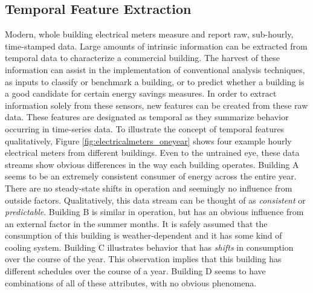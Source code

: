 \subsection{Temporal Feature Extraction}
\label{temporalfeatureextraction}
Modern, whole building electrical meters measure and report raw, sub-hourly, time-stamped data. Large amounts of intrinsic information can be extracted from temporal data to characterize a commercial building. The harvest of these information can assist in the implementation of conventional analysis techniques, as inputs to classify or benchmark a building, or to predict whether a building is a good candidate for certain energy savings measures. In order to extract information solely from these sensors, new features can be created from these raw data. These features are designated as temporal as they summarize behavior occurring in time-series data. To illustrate the concept of temporal features qualitatively, Figure \ref{fig:electricalmeters_oneyear} shows four example hourly electrical meters from different buildings. Even to the untrained eye, these data streams show obvious differences in the way each building operates. Building A seems to be an extremely consistent consumer of energy across the entire year. There are no steady-state shifts in operation and seemingly no influence from outside factors. Qualitatively, this data stream can be thought of as \emph{consistent} or \emph{predictable}. Building B is similar in operation, but has an obvious influence from an external factor in the summer months. It is safely assumed that the consumption of this building is weather-dependent and it has some kind of cooling system. Building C illustrates behavior that has \emph{shifts} in consumption over the course of the year. This observation implies that this building has different schedules over the course of a year. Building D seems to have combinations of all of these attributes, with no obvious phenomena. 
